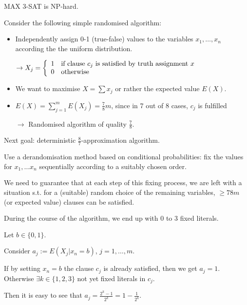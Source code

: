\documentclass[11pt]{article}
\theoremstyle{definition}
\theoremstyle{definition}
\begin{document}
MAX 3-SAT is NP-hard.

Consider the following simple randomised algorithm:
\begin{itemize}
\item Independently assign 0-1 (true-false) values to the variables $ x_1, \dots, x_n $ according the the uniform distribution.

$ \rightarrow X_j = \left\{ \begin{array}{l l} 1 & \text{if clause $ c_j $ is satisfied by truth assignment } x \\ 0 & \text{otherwise} \end{array} \right. $

\item We want to maximise $ X = \sum x_j $ or rather the expected value $ E(X) $.

\item $ E(X) = \sum \limits_{j = 1}^m E(X_j) = \frac{7}{8} m $, since in 7 out of 8 cases, $ c_j $ is fulfilled %

$ \rightarrow $ Randomised algorithm of quality $ \frac{7}{8} $.
\end{itemize} \medskip

Next goal: deterministic $ \frac{8}{7} $-approximation algorithm.

Use a derandomisation method based on conditional probabilities: fix the values for $ x_1, \dots x_n $ sequentially according to a suitably chosen order.

We need to guarantee that at each step of this fixing process, we are left with a situation s.t. for a (suitable) random choice of the remaining variables, $ \geq {7}{8}m $ (or expected value) clauses can be satisfied. \newline

During the course of the algorithm, we end up with 0 to 3 fixed literals. \newline

Let $ b \in \{0, 1\} $.

Consider $ a_j := E(X_j | x_n = b ) $, $ j = 1, \dots, m $.

If by setting $ x_n = b $ the clause $ c_j $ is already satisfied, then we get $ a_j = 1 $. Otherwise $ \exists k \in \{1, 2, 3\} $ not yet fixed literals in $ c_j $. \newline

Then it is easy to see that $ a_j = \frac{2^k - 1}{2^k} = 1 - \frac{1}{2^k} $.
\end{document}
